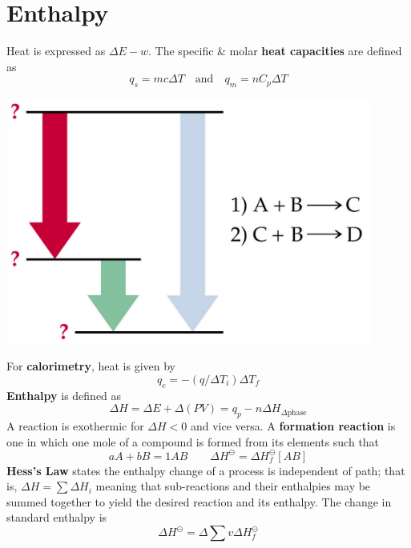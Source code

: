 \documentclass{tufte-book}
\renewcommand{\emph}[1]{\textbf{#1}}
\begin{document}
\section{Enthalpy}

Heat is expressed as $\Delta E - w$. The specific \& molar \emph{heat capacities} are defined as \begin{equation}
  q_s = mc \Delta T \quad\text{and}\quad q_m = nC_p \Delta T
\end{equation}
%
\begin{marginfigure}[-10mm]
\begin{center}
  \includegraphics[width=0.9\textwidth]{hess}
\end{center}
\end{marginfigure}
%
For \emph{calorimetry}, heat is given by \begin{equation}
  q_c = -(q / \Delta T_i) \Delta T_f
\end{equation}
\emph{Enthalpy} is defined as \begin{equation}
  \Delta H = \Delta E + \Delta (PV) = q_p - n \Delta H_{\Delta \text{phase}}
\end{equation}
A reaction is exothermic for $\Delta H<0$ and vice versa. A \emph{formation reaction} is one in which one mole of a compound is formed from its elements such that
\begin{equation}
  aA + bB = 1AB \qquad \Delta H^\ominus = \Delta H_f^\ominus [AB]
\end{equation}
\emph{Hess's Law} states the enthalpy change of a process is independent of path; that is, $\Delta H = \sum \Delta H_i$ meaning that sub-reactions and their enthalpies may be summed together to yield the desired reaction and its enthalpy. The change in standard enthalpy is \begin{equation}
  \Delta H^\ominus = \Delta \sum v \Delta H_f^\ominus
\end{equation}
\end{document}
